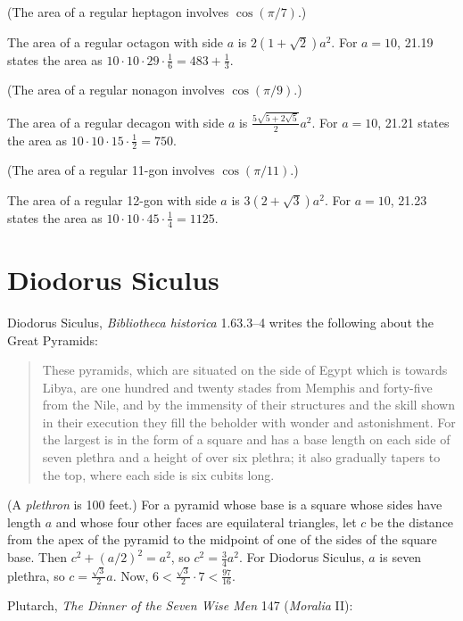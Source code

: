 \documentclass{amsart}
\theoremstyle{definition}
\begin{document}
(The area of a regular heptagon involves $\cos(\pi/7)$.)

The area of a regular octagon with side $a$ is $2(1+\sqrt{2})a^2$.
For $a=10$, 21.19 \cite[p.~385]{heronisIV} states the area as
$10 \cdot 10 \cdot 29 \cdot \frac{1}{6} = 483+\frac{1}{3}$. 

(The area of a regular nonagon involves $\cos(\pi/9)$.)

The area of a regular decagon with side $a$ is $\frac{5\sqrt{5+2\sqrt{5}}}{2} a^2$. 
For $a=10$, 21.21 states the area as $10\cdot 10 \cdot 15 \cdot \frac{1}{2}=750$. 

(The area of a regular 11-gon involves $\cos(\pi/11)$.)

The area of a regular 12-gon with side $a$ is $3(2+\sqrt{3})a^2$. For $a=10$, 21.23 \cite[p.~387]{heronisIV}
states the area as $10 \cdot 10 \cdot 45 \cdot \frac{1}{4}=1125$. 







\section{Diodorus Siculus}
Diodorus Siculus, {\em Bibliotheca historica} 1.63.3--4 writes the following about the Great Pyramids:

\begin{quote}
These pyramids, which are situated on the side of Egypt which is towards Libya, are one hundred and twenty stades from Memphis and forty-five from the Nile, and by the
immensity of their structures and the skill shown in their execution they fill the beholder with wonder and astonishment. For the largest is in the form of a square and has a base length on each side of seven plethra and a height of over six plethra; it also gradually tapers to the top, where each side is six cubits long.
\end{quote} 

(A {\em plethron} is 100 feet.)
For a pyramid whose base is a square whose sides have length $a$ and whose four other faces are equilateral triangles, let $c$ be the distance from the apex of the pyramid to the
midpoint of one of the sides of the square base. 
Then $c^2+(a/2)^2=a^2$, so $c^2=\frac{3}{4} a^2$. For Diodorus Siculus, $a$ is seven plethra, so $c= \frac{\sqrt{3}}{2} a$. Now, 
$6<\frac{\sqrt{3}}{2} \cdot 7<\frac{97}{16}$.

Plutarch, {\em The Dinner of the Seven Wise Men} 147 ({\em Moralia} II):
\end{document}
